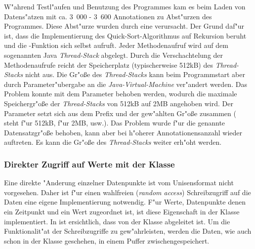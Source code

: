 W"ahrend Testl"aufen und Benutzung des Programmes kam es beim Laden von Datens"atzen mit ca. \unit{3.000} - \unit{3.600} Annotationen zu Abst"urzen des Programmes.
Diese Abst"urze wurden durch eine  verursacht.
Der Grund daf"ur ist, dass die Implementierung des Quick-Sort-Algorithmus auf Rekursion beruht und die -Funktion sich selbst aufruft.
Jeder Methodenaufruf wird auf dem sogenannten Java \emph{Thread-Stack} abgelegt.
Durch die Verschachtelung der Methodenaufrufe reicht der Speicherplatz (typischerweise \unit{512}{kB}) des \emph{Thread-Stacks} nicht aus.
Die Gr"o{\ss}e des \emph{Thread-Stacks} kann beim Programmstart aber durch Parameter"ubergabe an die \emph{Java-Virtual-Machine} ver"andert werden.
Das Problem konnte mit dem Parameter  behoben werden, wodurch die maximale Speichergr"o{\ss}e der \emph{Thread-Stacks} von \unit{512}{kB} auf \unit{2}{MB} angehoben wird.
Der Parameter setzt sich aus dem Prefix  und der gew"ahlten Gr"o{\ss}e zusammen ( steht f"ur \unit{512}{kB},  f"ur \unit{2}{MB}, usw.).
Das Problem wurde f"ur die genannte Datensatzgr"o{\ss}e behoben, kann aber bei h"oherer Annotationensanzahl wieder auftreten.
Es kann die Gr"o{\ss}e des \emph{Thread-Stacks} weiter erh"oht werden.


\subsubsection{Direkter Zugriff auf Werte mit der Klasse }

Eine direkte "Anderung einzelner Datenpunkte ist vom Unisensformat nicht vorgesehen.
Daher ist f"ur einen wahlfreien (\emph{random access}) Schreibzugriff auf die Daten eine eigene Implementierung notwendig.
F"ur Werte, Datenpunkte denen ein Zeitpunkt und ein Wert zugeordnet ist, ist diese Eigenschaft in der Klasse  implementiert.
In  ist ersichtlich, dass  von der Klasse  abgeleitet ist.
Um die Funktionalit"at der Schreibzugriffe zu gew"ahrleisten, werden die Daten, wie auch schon in der Klasse  geschehen, in einem Puffer  zwischengespeichert.

